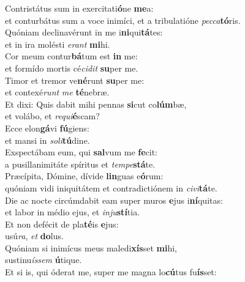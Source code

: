 \evenverse Contristátus sum in exercitati\textbf{ó}ne \textbf{me}a:~\*\\
\evenverse et conturbátus sum a voce inimíci, et a tribulatióne \textit{pec}\textit{ca}\textbf{tó}ris.\\
\oddverse Quóniam declinavérunt in me i\textbf{ni}qui\textbf{tá}tes:~\*\\
\oddverse et in ira molésti \textit{e}\textit{rant} \textbf{mi}hi.\\
\evenverse Cor meum contur\textbf{bá}tum est \textbf{in} me:~\*\\
\evenverse et formído mortis cé\textit{ci}\textit{dit} \textbf{su}per me.\\
\oddverse Timor et tremor ve\textbf{né}runt \textbf{su}per me:~\*\\
\oddverse et contexé\textit{runt} \textit{me} \textbf{té}nebræ.\\
\evenverse Et dixi: Quis dabit mihi pennas \textbf{si}cut co\textbf{lúm}bæ,~\*\\
\evenverse et volábo, et \textit{re}\textit{qui}\textbf{é}scam?\\
\oddverse Ecce elon\textbf{gá}vi \textbf{fú}giens:~\*\\
\oddverse et mansi in \textit{so}\textit{li}\textbf{tú}dine.\\
\evenverse Exspectábam eum, qui \textbf{sal}vum me \textbf{fe}cit:~\*\\
\evenverse a pusillanimitáte spíritus et \textit{tem}\textit{pe}\textbf{stá}te.\\
\oddverse Præcípita, Dómine, dívide \textbf{lin}guas e\textbf{ó}rum:~\*\\
\oddverse quóniam vidi iniquitátem et contradictiónem in \textit{ci}\textit{vi}\textbf{tá}te.\\
\evenverse Die ac nocte circúmdabit eam super muros \textbf{e}jus i\textbf{ní}quitas:~\*\\
\evenverse et labor in médio ejus, et \textit{in}\textit{ju}\textbf{stí}tia.\\
\oddverse Et non defécit de pla\textbf{té}is \textbf{e}jus:~\*\\
\oddverse usú\textit{ra}, \textit{et} \textbf{do}lus.\\
\evenverse Quóniam si inimícus meus maledi\textbf{xís}set \textbf{mi}hi,~\*\\
\evenverse sustinu\textit{ís}\textit{sem} \textbf{ú}tique.\\
\oddverse Et si is, qui óderat me, super me magna lo\textbf{cú}tus fu\textbf{ís}set:~\*\\
